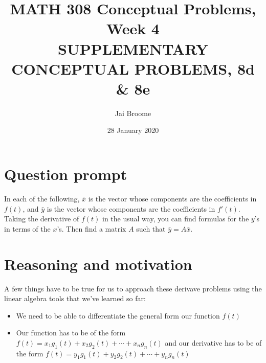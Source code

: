 \documentclass[12pt]{article}
\title{MATH 308 Conceptual Problems, Week 4 \vspace{1em}\\\normalsize{SUPPLEMENTARY CONCEPTUAL PROBLEMS, 8d \& 8e}}
\author{Jai Broome}
\date{28 January 2020}
\begin{document}

\maketitle

\section{Question prompt}

In each of the following, $\bar{x}$ is the vector whose components are the coefficients
in $f(t)$, and $\bar{y}$ is the vector whose components are the coefficients in $f'(t)$. Taking
the derivative of $f(t)$ in the usual way, you can find formulas for the $y$'s in terms
of the $x$'s. Then find a matrix $A$ such that $\bar{y}=A\bar{x}$.

\section{Reasoning and motivation}

A few things have to be true for us to approach these derivave problems using the linear algebra
tools that we've learned so far:

\begin{itemize}
  \item We need to be able to differentiate the general form our function $f(t)$ 
  \item Our function has to be of the form $f(t)=x_1g_1(t)+x_2g_2(t)+\cdots +x_ng_n(t)$ and
    our derivative has to be of the form $f(t)=y_1g_1(t)+y_2g_2(t)+\cdots +y_ng_n(t)$
\end{itemize}
\end{document}
